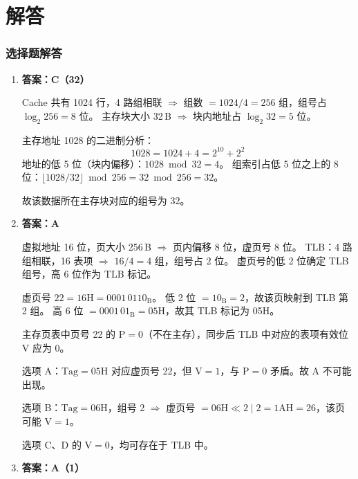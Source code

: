 \documentclass[12pt,a4paper]{ctexart}
\begin{document}

\newpage
\part{解答}

\section{选择题解答}

\begin{enumerate}[leftmargin=*]

\item \textbf{答案：C（32）}

Cache 共有 1024 行，4 路组相联 $\Rightarrow$ 组数 $= 1024/4 = 256$ 组，组号占 $\log_2 256 = 8$ 位。
主存块大小 32\,B $\Rightarrow$ 块内地址占 $\log_2 32 = 5$ 位。

主存地址 1028 的二进制分析：
\[
1028 = 1024 + 4 = 2^{10} + 2^2
\]
地址的低 5 位（块内偏移）：$1028 \bmod 32 = 4$。
组索引占低 5 位之上的 8 位：$\lfloor 1028/32 \rfloor \bmod 256 = 32 \bmod 256 = 32$。

故该数据所在主存块对应的组号为 32。

\item \textbf{答案：A}

虚拟地址 16 位，页大小 256\,B $\Rightarrow$ 页内偏移 8 位，虚页号 8 位。
TLB：4 路组相联，16 表项 $\Rightarrow$ $16/4 = 4$ 组，组号占 2 位。
虚页号的低 2 位确定 TLB 组号，高 6 位作为 TLB 标记。

虚页号 $22 = \mathrm{16H} = 0001\,0110_{\mathrm{B}}$。
低 2 位 $= 10_{\mathrm{B}} = 2$，故该页映射到 TLB 第 2 组。
高 6 位 $= 0001\,01_{\mathrm{B}} = \mathrm{05H}$，故其 TLB 标记为 05H。

主存页表中页号 22 的 $\mathrm{P}=0$（不在主存），同步后 TLB 中对应的表项有效位 $\mathrm{V}$ 应为 0。

选项 A：$\mathrm{Tag}=\mathrm{05H}$ 对应虚页号 22，但 $\mathrm{V}=1$，与 $\mathrm{P}=0$ 矛盾。故 A 不可能出现。

选项 B：$\mathrm{Tag}=\mathrm{06H}$，组号 2 $\Rightarrow$ 虚页号 $= \mathrm{06H} \ll 2 \mid 2 = \mathrm{1AH} = 26$，该页可能 $\mathrm{V}=1$。

选项 C、D 的 $\mathrm{V}=0$，均可存在于 TLB 中。

\item \textbf{答案：A（1）}


\end{enumerate}
\end{document}
